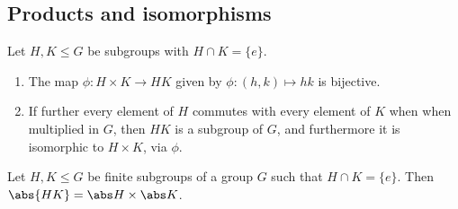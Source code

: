 \documentclass{article}
\begin{document}
\subsection{Products and isomorphisms}

\begin{theorem}
    Let $H,K\leq G$ be subgroups with $H\cap K=\{e\}$.
    \begin{enumerate}
        \item The map $\phi:H\times K\to HK$ given by $\phi:(h,k)\mapsto hk$ is bijective.
        \item If further every element of $H$ commutes with every element of $K$ when
              when multiplied in $G$, then $HK$ is a subgroup of $G$, and
              furthermore it is isomorphic to $H\times K$, via $\phi$.
    \end{enumerate}
\end{theorem}

\begin{corollary}
    Let $H,K\leq G$ be finite subgroups of a group $G$ such that
    $H\cap K=\{e\}$. Then $\abs{HK} = \abs H \times \abs K$.
\end{corollary}
\end{document}
